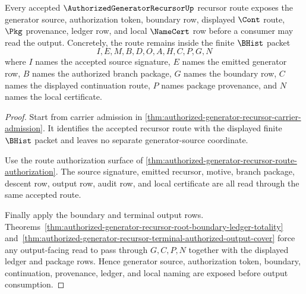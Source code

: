 \begin{theorem}
\label{thm:authorized-generator-recursor-root-source}
Every accepted $\AuthorizedGeneratorRecursorUp$ recursor route exposes the generator source, authorization token, boundary row, displayed $\Cont$ route, $\Pkg$ provenance, ledger row, and local $\NameCert$ row before a consumer may read the output. Concretely, the route remains inside the finite $\BHist$ packet
$$
I,E,M,B,D,O,A,H,C,P,G,N
$$
where $I$ names the accepted source signature, $E$ names the emitted generator row, $B$ names the authorized branch package, $G$ names the boundary row, $C$ names the displayed continuation route, $P$ names package provenance, and $N$ names the local certificate.
\end{theorem}
\begin{proof}
Start from carrier admission in \autoref{thm:authorized-generator-recursor-carrier-admission}. It identifies the accepted recursor route with the displayed finite $\BHist$ packet and leaves no separate generator-source coordinate.

Use the route authorization surface of \autoref{thm:authorized-generator-recursor-route-authorization}. The source signature, emitted recursor, motive, branch package, descent row, output row, audit row, and local certificate are all read through the same accepted route.

Finally apply the boundary and terminal output rows. Theorems~\ref{thm:authorized-generator-recursor-root-boundary-ledger-totality} and~\ref{thm:authorized-generator-recursor-terminal-authorized-output-cover} force any output-facing read to pass through $G,C,P,N$ together with the displayed ledger and package rows. Hence generator source, authorization token, boundary, continuation, provenance, ledger, and local naming are exposed before output consumption.
\end{proof}

